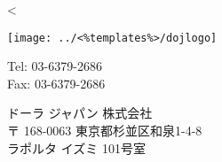 \parbox[t]{.45\textwidth}{
\vspace{0.3cm}
<%
}
\parbox[t]{.48\textwidth}{

\parbox[t]{.30\textwidth}{
\vspace{0.0cm}
\texttt{[image: ../<\%templates\%>/dojlogo]} \\
}
\parbox[t]{.17\textwidth}{
\vspace{1.0cm}
     \small Tel: 03-6379-2686 \\
     \small Fax: 03-6379-2686
}

\parbox[t]{.47\textwidth}{
	ドーラ ジャパン 株式会社 \\
	〒 168-0063 東京都杉並区和泉1-4-8 \\
	ラポルタ イズミ 101号室 \\
}

}